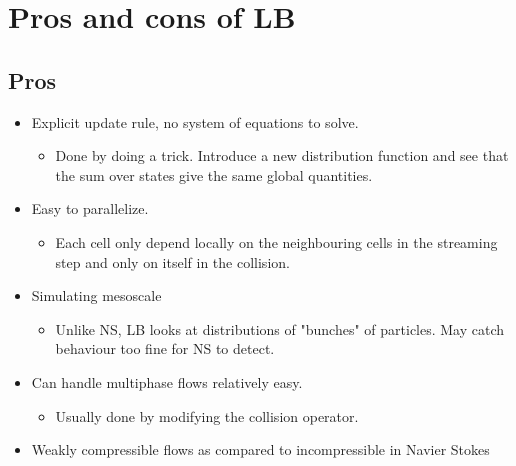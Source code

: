 

\section{Pros and cons of LB}

\subsection{Pros}
\begin{itemize}
    \item Explicit update rule, no system of equations to solve.
    \begin{itemize}
        \item Done by doing a trick. Introduce a new distribution function 
              and see that the sum over states give the same global quantities.
    \end{itemize}

    \item Easy to parallelize.
        \begin{itemize}
            \item Each cell only depend locally on the neighbouring cells in
                  the streaming step and only on itself in the collision.
        \end{itemize}

    \item Simulating mesoscale
        \begin{itemize}
            \item Unlike NS, LB looks at distributions of "bunches" of
                  particles. May catch behaviour too fine for NS to detect.
        \end{itemize}
    \item Can handle multiphase flows relatively easy.
        \begin{itemize}
            \item Usually done by modifying the collision operator.
        \end{itemize}
    \item Weakly compressible flows as compared to incompressible in Navier Stokes

\end{itemize}

